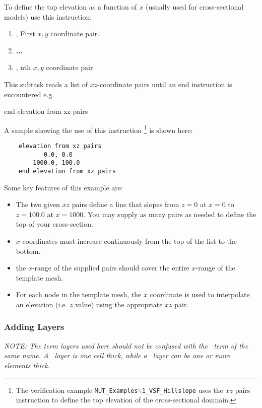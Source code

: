 To define the top elevation as a function of $x$ (usually used for cross-sectional models) use this instruction:

    {
    \squish
    \begin{enumerate}
    \item {},   First $x, y$ coordinate pair.
    \item \textbf{...}
    \item {},   nth $x, y$ coordinate pair.
    \end{enumerate}

     This subtask reads a list of $xz$-coordinate pairs until an \textsf{end} instruction is encountered e.g.\:

    {\Large \sf end elevation from xz pairs}
    }

A sample showing the use of this instruction \footnote{The verification example \texttt{MUT\_Examples$\backslash$1\_VSF\_Hillslope} uses the $xz$ pairs instruction to define the top elevation of the cross-sectional domnain.} is shown here:
    \begin{verbatim}
    elevation from xz pairs
           0.0, 0.0
        1000.0, 100.0
    end elevation from xz pairs
     \end{verbatim}
     \squish
Some key features of this example are:
\begin{itemize}
  \item The two given $xz$ pairs define a line that slopes from $z=0$ at $x=0$ to $z=100.0$ at $x=1000$.  You may supply as many pairs as needed to define the top of your cross-section.
  \item $x$ coordinates must increase continuously from the top of the list to the bottom.
  \item the $x$-range of the supplied pairs should cover the entire $x$-range of the template mesh.
  \item For each node in the template mesh, the $x$ coordinate is used to interpolate an elevation (i.e. $z$ value) using the appropriate $xz$ pair.
\end{itemize}

\subsubsection{Adding Layers} 
    {\em NOTE: The term layers used here should not be confused with the \mf\ term of the same name. A \mf\ layer is one cell thick, while a \mut\ layer can be one or more elements thick.}


